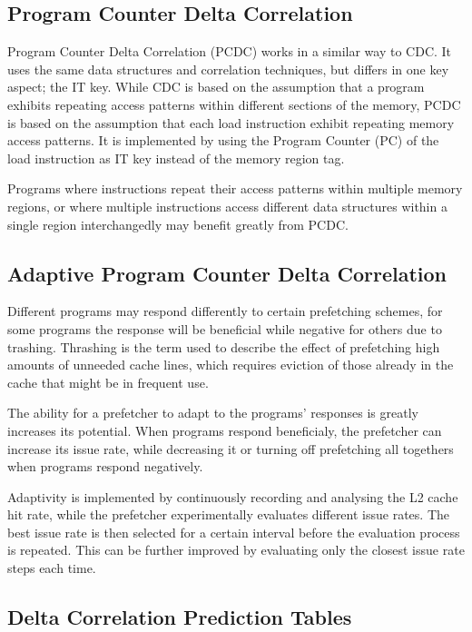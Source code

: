\documentclass[a4paper]{IEEEtran}
\begin{document}
\subsection{Program Counter Delta Correlation}

Program Counter Delta Correlation (PCDC) works in a similar way to CDC.
It uses the same data structures and correlation techniques, but differs in one key aspect; the IT key.
While CDC is based on the assumption that a program exhibits repeating access patterns within different sections of the memory, PCDC is based on the assumption that each load instruction exhibit repeating memory access patterns.
It is implemented by using the Program Counter (PC) of the load instruction as IT key instead of the memory region tag.

Programs where instructions repeat their access patterns within multiple memory regions, or where multiple instructions access different data structures within a single region interchangedly may benefit greatly from PCDC.

\subsection{Adaptive Program Counter Delta Correlation}

Different programs may respond differently to certain prefetching schemes, for some programs the response will be beneficial while negative for others due to trashing.
Thrashing is the term used to describe the effect of prefetching high amounts of unneeded cache lines, which requires eviction of those already in the cache that might be in frequent use.

The ability for a prefetcher to adapt to the programs' responses is greatly increases its potential.
When programs respond beneficialy, the prefetcher can increase its issue rate, while decreasing it or turning off prefetching all togethers when programs respond negatively.

Adaptivity is implemented by continuously recording and analysing the L2 cache hit rate, while the prefetcher experimentally evaluates different issue rates.
The best issue rate is then selected for a certain interval before the evaluation process is repeated.
This can be further improved by evaluating only the closest issue rate steps each time.

\subsection{Delta Correlation Prediction Tables}
\end{document}

